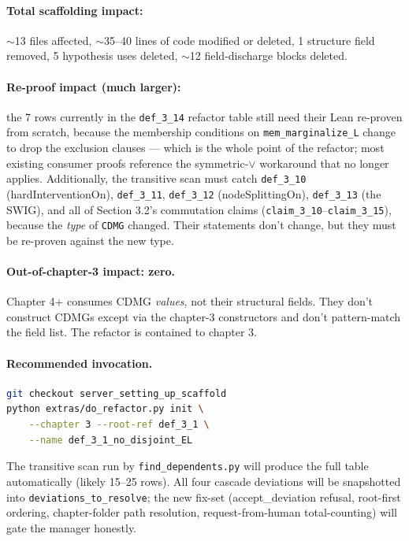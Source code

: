 \documentclass[11pt,a4paper]{article}
\begin{document}
\paragraph{Total scaffolding impact:} $\sim$13 files affected,
$\sim$35--40 lines of code modified or deleted, 1 structure field
removed, 5 hypothesis uses deleted, $\sim$12 field-discharge blocks
deleted.

\paragraph{Re-proof impact (much larger):} the 7 rows currently in
the \texttt{def\_3\_14} refactor table still need their Lean re-proven
from scratch, because the membership conditions on
\verb|mem_marginalize_L| change to drop the exclusion clauses ---
which is the whole point of the refactor; most existing consumer
proofs reference the symmetric-$\vee$ workaround that no longer
applies. Additionally, the transitive scan must catch
\texttt{def\_3\_10} (hardInterventionOn), \texttt{def\_3\_11},
\texttt{def\_3\_12} (nodeSplittingOn), \texttt{def\_3\_13} (the SWIG),
and all of Section 3.2's commutation claims
(\texttt{claim\_3\_10}--\texttt{claim\_3\_15}), because the
\emph{type} of \texttt{CDMG} changed. Their statements don't change,
but they must be re-proven against the new type.

\paragraph{Out-of-chapter-3 impact: zero.} Chapter 4+ consumes
CDMG \emph{values}, not their structural fields. They don't construct
CDMGs except via the chapter-3 constructors and don't pattern-match
the field list. The refactor is contained to chapter 3.

\paragraph{Recommended invocation.}
\begin{lstlisting}[language=bash]
git checkout server_setting_up_scaffold
python extras/do_refactor.py init \
    --chapter 3 --root-ref def_3_1 \
    --name def_3_1_no_disjoint_EL
\end{lstlisting}
The transitive scan run by \texttt{find\_dependents.py} will produce
the full table automatically (likely 15--25 rows). All four cascade
deviations will be snapshotted into \verb|deviations_to_resolve|; the
new fix-set (accept\_deviation refusal, root-first ordering,
chapter-folder path resolution, request-from-human total-counting)
will gate the manager honestly.
\end{document}
